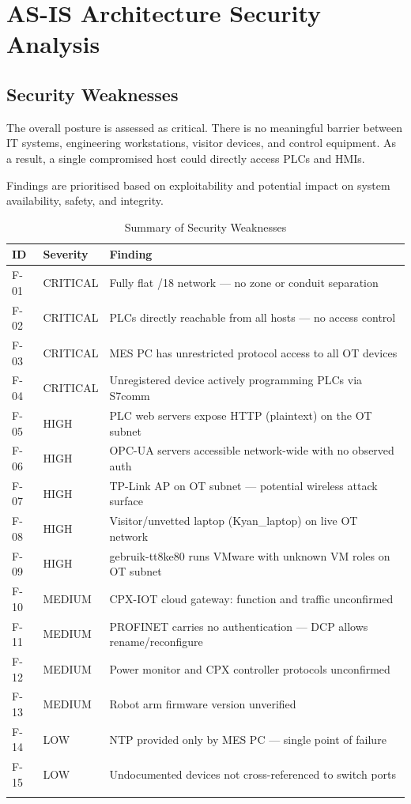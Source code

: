 \documentclass{report}
\begin{document}

\section{AS-IS Architecture Security Analysis}


\subsection{Security Weaknesses}
The overall posture is assessed as critical. There is no meaningful barrier between IT systems, engineering workstations, visitor devices, and control equipment. As a result, a single compromised host could directly access PLCs and HMIs. 

Findings are prioritised based on exploitability and potential impact on system availability, safety, and integrity.

\begin{longtable}{L{1.3cm} L{1.8cm} L{12.0cm}}
\toprule
\textbf{ID} & \textbf{Severity} & \textbf{Finding} \\
\midrule \endhead
F-01 & CRITICAL & Fully flat /18 network --- no zone or conduit separation \\
F-02 & CRITICAL & PLCs directly reachable from all hosts --- no access control \\
F-03 & CRITICAL & MES PC has unrestricted protocol access to all OT devices \\
F-04 & CRITICAL & Unregistered device actively programming PLCs via S7comm \\
F-05 & HIGH & PLC web servers expose HTTP (plaintext) on the OT subnet \\
F-06 & HIGH & OPC-UA servers accessible network-wide with no observed auth \\
F-07 & HIGH & TP-Link AP on OT subnet --- potential wireless attack surface \\
F-08 & HIGH & Visitor/unvetted laptop (Kyan\_laptop) on live OT network \\
F-09 & HIGH & gebruik-tt8ke80 runs VMware with unknown VM roles on OT subnet \\
F-10 & MEDIUM & CPX-IOT cloud gateway: function and traffic unconfirmed \\
F-11 & MEDIUM & PROFINET carries no authentication --- DCP allows rename/reconfigure \\
F-12 & MEDIUM & Power monitor and CPX controller protocols unconfirmed \\
F-13 & MEDIUM & Robot arm firmware version unverified \\
F-14 & LOW & NTP provided only by MES PC --- single point of failure \\
F-15 & LOW & Undocumented devices not cross-referenced to switch ports \\
\bottomrule
\caption{Summary of Security Weaknesses}\\
\end{longtable}
\end{document}
